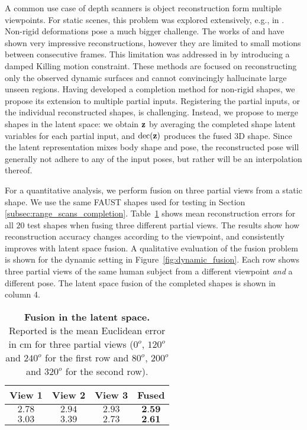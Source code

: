 A common use case of depth scanners is object reconstruction form multiple viewpoints. For static scenes, this problem was explored extensively, e.g., in \cite{newcombe2011kinectfusion,niessner2013real,endres2012evaluation}. Non-rigid deformations pose a much bigger challenge. The works of \cite{newcombe2015dynamicfusion} and \cite{innmann2016volumedeform} have shown very impressive reconstructions, however they are limited to small motions between consecutive frames. This limitation was addressed in \cite{slavcheva2017killingfusion} by introducing a damped Killing motion constraint. These methods are focused on reconstructing only the observed dynamic surfaces and cannot convincingly hallucinate large unseen regions. 
Having developed a completion method for non-rigid shapes, we propose its extension to multiple partial inputs. Registering the partial inputs, or the individual reconstructed shapes, is challenging. Instead, we propose to merge shapes in the latent space: we obtain $\bm{\mathrm{z}}$ by averaging the completed shape latent variables for each partial input, and $\mathrm{dec}(\bm{\mathrm{z}})$ produces the fused 3D shape. Since the latent representation mixes body shape and pose, the reconstructed pose will generally not adhere to any of the input poses, but rather will be an interpolation thereof. 

For a quantitative analysis, we perform fusion on three partial views from a static shape. We use the same FAUST shapes used for testing in Section \ref{subsec:range_scans_completion}. Table~\ref{tab:static_fusion} shows mean reconstruction errors for all $20$ test shapes when fusing three different partial views. The results show how reconstruction accuracy changes according to the viewpoint, and consistently improves with latent space fusion. A qualitative evaluation of the fusion problem is shown for the dynamic setting in Figure~\ref{fig:dynamic_fusion}. Each row shows three partial views of the same human subject from a different viewpoint \emph{and} a different pose. The latent space fusion of the completed shapes is shown in column 4. %


\begin{table}[tb]
\centering
\small
\begin{tabular}{ c c c c }
    \hline\hline
     View 1 & View 2 & View 3 & Fused  \\ \hline  
     $2.78$ & $2.94$ & $2.93$ & $\textbf{2.59}$ \\
     $3.03$ & $3.39$ & $2.73$ & $\textbf{2.61}$ \\ 
     \hline \hline 
\end{tabular}   
  \vspace{2mm}

\caption{\small \textbf{Fusion in the latent space.}
Reported is the mean Euclidean error in cm for three partial views ($0^o$, $120^o$ and $240^o$ for the first row and $80^o$, $200^o$ and $320^o$ for the second row). 
}

\label{tab:static_fusion}
\end{table}



